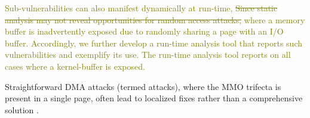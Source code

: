 
\textcolor{olive}{Sub-vulnerabilities can also manifest dynamically at run-time, 
\st{Since static analysis may not reveal opportunities for random access attacks,} where a memory buffer is inadvertently exposed due to randomly sharing a page with an I/O buffer. Accordingly, we further develop a run-time analysis tool that reports such vulnerabilities and exemplify its use. The run-time analysis tool reports on all cases where a kernel-buffer is exposed. }



Straightforward DMA attacks (termed \simple attacks), where the MMO trifecta is present in a single page, often lead to localized fixes rather than a comprehensive solution \cite{thunder}.


